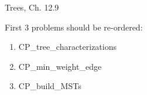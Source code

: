 \documentclass[handout]{mcs}
\begin{document}

\begin{staffnotes}
Trees, Ch. 12.9 
\end{staffnotes}


\begin{staffnotes}
First 3 problems should be re-ordered:
\begin{enumerate}
\item CP\_tree\_characterizations
\item CP\_min\_weight\_edge
\item CP\_build\_MSTs
\end{enumerate}

\end{staffnotes}








\end{document}
